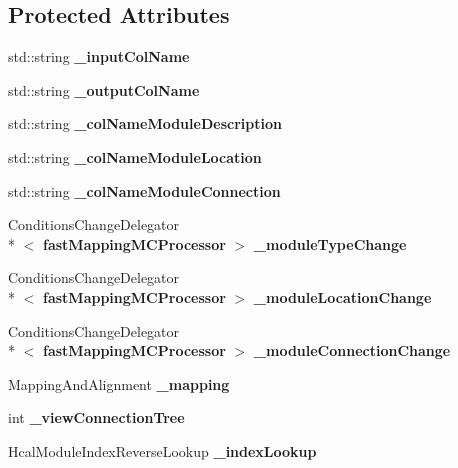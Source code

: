 \subsection*{Protected Attributes}
\begin{DoxyCompactItemize}
\item 
std\-::string {\bfseries \-\_\-input\-Col\-Name}\label{classCALICE_1_1fastMappingMCProcessor_a60c85c8ed4568c43d501b2f99225e799}

\item 
std\-::string {\bfseries \-\_\-output\-Col\-Name}\label{classCALICE_1_1fastMappingMCProcessor_a1cd51bb3f877ee4cf7b084a5dfb2e29b}

\item 
std\-::string {\bfseries \-\_\-col\-Name\-Module\-Description}\label{classCALICE_1_1fastMappingMCProcessor_a6151f9764b61143a403e7b5c1bf34387}

\item 
std\-::string {\bfseries \-\_\-col\-Name\-Module\-Location}\label{classCALICE_1_1fastMappingMCProcessor_a9a0f0f3f6d1eb5c7cb3f82afa0f06a15}

\item 
std\-::string {\bfseries \-\_\-col\-Name\-Module\-Connection}\label{classCALICE_1_1fastMappingMCProcessor_a37c008b2b1a94829e76c6d9d2da4ecbd}

\item 
Conditions\-Change\-Delegator\\*
$<$ {\bf fast\-Mapping\-M\-C\-Processor} $>$ {\bfseries \-\_\-module\-Type\-Change}\label{classCALICE_1_1fastMappingMCProcessor_a002d46e3f4a40e2a9c44a2f442f2fb19}

\item 
Conditions\-Change\-Delegator\\*
$<$ {\bf fast\-Mapping\-M\-C\-Processor} $>$ {\bfseries \-\_\-module\-Location\-Change}\label{classCALICE_1_1fastMappingMCProcessor_abf4769a3e7af7dc0c3948d3a80177133}

\item 
Conditions\-Change\-Delegator\\*
$<$ {\bf fast\-Mapping\-M\-C\-Processor} $>$ {\bfseries \-\_\-module\-Connection\-Change}\label{classCALICE_1_1fastMappingMCProcessor_aef9057a9c5397b37fc04feb80ff8cefc}

\item 
Mapping\-And\-Alignment {\bfseries \-\_\-mapping}\label{classCALICE_1_1fastMappingMCProcessor_a01bc3fbd03d5743378634a88048feb4f}

\item 
int {\bfseries \-\_\-view\-Connection\-Tree}\label{classCALICE_1_1fastMappingMCProcessor_a7056c93cf2c9a55900b913d107ee664a}

\item 
Hcal\-Module\-Index\-Reverse\-Lookup {\bfseries \-\_\-index\-Lookup}\label{classCALICE_1_1fastMappingMCProcessor_a4548d21ad3b70db058cadb1b9050494d}

\end{DoxyCompactItemize}


